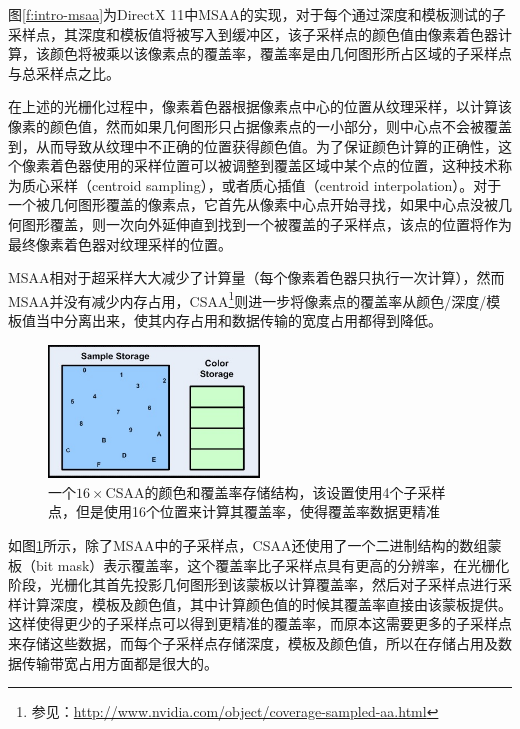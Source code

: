 图\ref{f:intro-msaa}为DirectX 11中MSAA的实现，对于每个通过深度和模板测试的子采样点，其深度和模板值将被写入到缓冲区，该子采样点的颜色值由像素着色器计算，该颜色将被乘以该像素点的覆盖率，覆盖率是由几何图形所占区域的子采样点与总采样点之比。

在上述的光栅化过程中，像素着色器根据像素点中心的位置从纹理采样，以计算该像素的颜色值，然而如果几何图形只占据像素点的一小部分，则中心点不会被覆盖到，从而导致从纹理中不正确的位置获得颜色值。为了保证颜色计算的正确性，这个像素着色器使用的采样位置可以被调整到覆盖区域中某个点的位置，这种技术称为质心采样（centroid sampling），或者质心插值（centroid interpolation）。对于一个被几何图形覆盖的像素点，它首先从像素中心点开始寻找，如果中心点没被几何图形覆盖，则一次向外延伸直到找到一个被覆盖的子采样点，该点的位置将作为最终像素着色器对纹理采样的位置。

MSAA相对于超采样大大减少了计算量（每个像素着色器只执行一次计算），然而MSAA并没有减少内存占用，CSAA\footnote{参见：\url{http://www.nvidia.com/object/coverage-sampled-aa.html}}则进一步将像素点的覆盖率从颜色/深度/模板值当中分离出来，使其内存占用和数据传输的宽度占用都得到降低。

\begin{figure}
\sidecaption
	\includegraphics[width=0.5\textwidth]{figures/intro/sample_coverage}
	\caption{一个$16\times$CSAA的颜色和覆盖率存储结构，该设置使用4个子采样点，但是使用16个位置来计算其覆盖率，使得覆盖率数据更精准}
	\label{f:intro-sample-coverage}
\end{figure}

如图\ref{f:intro-sample-coverage}所示，除了MSAA中的子采样点，CSAA还使用了一个二进制结构的数组蒙板（bit mask）表示覆盖率，这个覆盖率比子采样点具有更高的分辨率，在光栅化阶段，光栅化其首先投影几何图形到该蒙板以计算覆盖率，然后对子采样点进行采样计算深度，模板及颜色值，其中计算颜色值的时候其覆盖率直接由该蒙板提供。这样使得更少的子采样点可以得到更精准的覆盖率，而原本这需要更多的子采样点来存储这些数据，而每个子采样点存储深度，模板及颜色值，所以在存储占用及数据传输带宽占用方面都是很大的。

